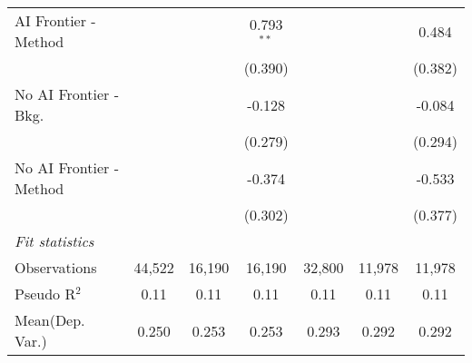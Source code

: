 \begin{tabular}{lcccccc}
   AI Frontier - Method    &               &               & 0.793$^{**}$  &               &              & 0.484\\   
                           &               &               & (0.390)       &               &              & (0.382)\\   
   No AI Frontier - Bkg.   &               &               & -0.128        &               &              & -0.084\\   
                           &               &               & (0.279)       &               &              & (0.294)\\   
   No AI Frontier - Method &               &               & -0.374        &               &              & -0.533\\   
                           &               &               & (0.302)       &               &              & (0.377)\\   
   \midrule
   \emph{Fit statistics}\\
   Observations            & 44,522        & 16,190        & 16,190        & 32,800        & 11,978       & 11,978\\  
   Pseudo R$^2$            & 0.11          & 0.11          & 0.11          & 0.11          & 0.11         & 0.11\\  
Mean(Dep. Var.) & 0.250 & 0.253 & 0.253 & 0.293 & 0.292 & 0.292 \\
   

\end{tabular}
